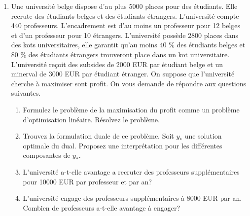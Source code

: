 \begin{enumerate}
\begin{solution}
\begin{itemize}
          \item Si $c < 0$, il n'y a pas de solution vu que $x_1\text{, }x_2 \text{, }x_3 \geq 0$.
          Si $0 \leq c < 6$, la solution se situe en $(0, -3)$ ce qui donne comme coût optimal $3c$.
          Si $c = 6$, tous les points du segment de la droite $2y_1+y_2 = -3$ entre $(-4/3,-1/3)$ et $(0,-3)$ sont des solutions optimales et ils donnent tous $18$ comme coût optimal (qui correspond bien à $3c$ aussi).
          Si $6 < c$, le point $(-4/3,-1/3)$ est optimal donc le coût optimal est de $12\frac{4}{3}+c\frac{1}{3} = 16+\frac{c}{3}$.
             
     \end{itemize}
   \end{solution}

  \item  Une université belge dispose d'au plus 5000 places pour des étudiants. Elle recrute des étudiants belges et
    des étudiants étrangers. L'université compte 440 professeurs. L'encadrement est d'au moins un professeur pour 12 belges et d'un professeur pour 10
    étrangers. L'université possède 2800 places dans des kots universitaires, elle garantit  qu'au moins 40 \% des étudiants belges et 80 \% des étudiants
    étrangers trouveront place  dans un kot universitaire. L'université reçoit des subsides de 2000 EUR par étudiant belge et un minerval de 3000 EUR par
    étudiant étranger. On suppose que l'université cherche à maximiser sont profit.  On vous demande de répondre aux questions suivantes.

    \begin{enumerate}
      \item  Formulez le problème de la maximisation du profit comme un problème d'optimisation linéaire. Résolvez le problème.

      \item Trouvez la formulation  duale de ce problème. Soit $y_*$ une solution optimale du dual. Proposez une interprétation pour les
        différentes composantes de
        $y_*$.

      \item   L'université a-t-elle avantage a recruter des professeurs supplémentaires pour 10000 EUR par professeur et par an?

      \item L'université engage des professeurs supplémentaires à 8000 EUR par an. Combien de professeurs a-t-elle avantage \`a engager?

    \end{enumerate}



\end{enumerate}
